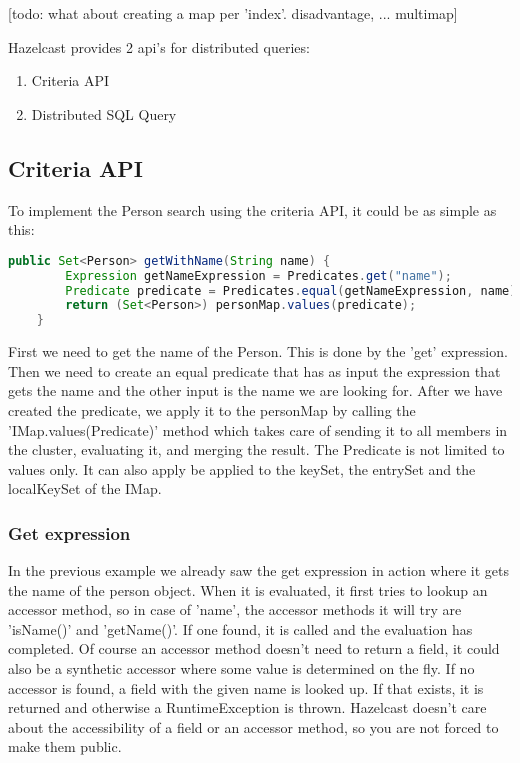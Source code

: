 [todo: what about creating a map per 'index'. disadvantage,  ... multimap]

Hazelcast provides 2 api's for distributed queries:
\begin{enumerate}
\item Criteria API
\item Distributed SQL Query
\end{enumerate}

\subsection*{Criteria API}
To implement the Person search using the criteria API, it could be as simple as this:
\begin{lstlisting}[language=java]
    public Set<Person> getWithName(String name) {
        Expression getNameExpression = Predicates.get("name");
        Predicate predicate = Predicates.equal(getNameExpression, name);
        return (Set<Person>) personMap.values(predicate);
    }
\end{lstlisting}
First we need to get the name of the Person. This is done by the 'get' expression. Then we need to create an equal predicate that has as input the expression that gets the name and the other input is the name we are looking for. After we have created the predicate, we apply it to the personMap by calling the 'IMap.values(Predicate)' method which takes care of sending it to all members in the cluster, evaluating it, and merging the result. The Predicate is not limited to values only. It can also apply be applied to the keySet, the entrySet and the localKeySet of the IMap. 

\subsubsection*{Get expression}
In the previous example we already saw the get expression in action where it gets the name of the person object. When it is evaluated, it first tries to lookup an accessor method, so in case of 'name', the accessor methods it will try are 'isName()' and 'getName()'. If one found, it is called and the evaluation has completed. Of course an accessor method doesn't need to return a field, it could also be a synthetic accessor where some value is determined on the fly. If no accessor is found, a field with the given name is looked up. If that exists, it is returned and otherwise a RuntimeException is thrown. Hazelcast doesn't care about the accessibility of a field or an accessor method, so you are not forced to make them public.

